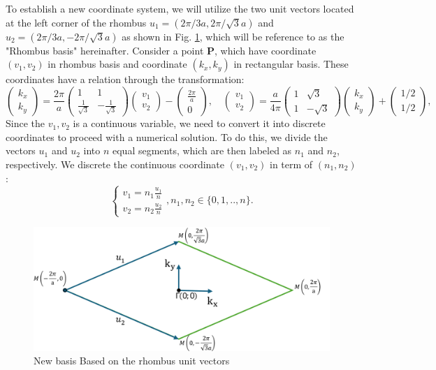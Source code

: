 \documentclass[12pt,english,a4paper]{article}
\begin{document}
\quad To establish a new coordinate system, we will utilize the two unit vectors located at the left corner of the rhombus $u_1 = (2\pi/3a,2\pi/\sqrt{3}a)$ and $u_2 = (2\pi/3a,-2\pi/\sqrt{3}a)$ as shown in Fig. \ref{rhombuskgrid}, which will be reference to as the "Rhombus basis" hereinafter. Consider a point $\textbf{P}$, which have coordinate $(v_1, v_2)$ in rhombus basis and coordinate $(k_x,k_y)$ in rectangular basis. These coordinates have a relation through the transformation:
\begin{equation}
	\begin{pmatrix} k_x \\ k_y \end{pmatrix}
	= \frac{2\pi}{a} \begin{pmatrix}
		1 & 1\\ \frac{1}{\sqrt{3}} & -\frac{1}{\sqrt{3}}\end{pmatrix} \begin{pmatrix} v_1 \\v_2\end{pmatrix} - \begin{pmatrix} \frac{2\pi}{a} \\ 0\end{pmatrix},\quad  \begin{pmatrix} v_1 \\v_2\end{pmatrix}
	= \frac{a}{4\pi} \begin{pmatrix}
		1 & \sqrt{3}\\1 & -\sqrt{3}\end{pmatrix}\begin{pmatrix} k_x \\ k_y \end{pmatrix}  + \begin{pmatrix} 1/2 \\ 1/2\end{pmatrix}, 
\end{equation}
\quad Since the $v_1,v_2$ is a continuous variable, we need to convert it into discrete coordinates to proceed with a numerical solution. To do this, we divide the vectors $u_1$ and $u_2$ into $n$ equal segments, which are then labeled as $n_{1}$ and $n_{2}$, respectively. We discrete the continuous coordinate $(v_1,v_2)$ in term of $(n_{1},n_{2})$:
$$\begin{cases}
	v_1 = n_{1} \frac{u_1}{n}\\
	v_2 = n_{2} \frac{u_2}{n}
\end{cases}, n_1, n_2 \in \{0,1,..,n\}.$$
\begin{figure}
	\begin{center}
		\includegraphics[width=0.5\linewidth]{Images/rhombuskgrid.pdf}
		\caption{New basis Based on the rhombus unit vectors}
		\label{rhombuskgrid}
	\end{center}
\end{figure}
\end{document}
